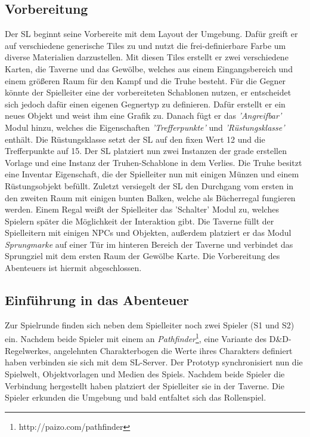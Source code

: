 \subsection{Vorbereitung}
\label{sec:Vorbereitung}
Der SL beginnt seine Vorbereite mit dem Layout der Umgebung. Dafür greift er auf verschiedene generische Tiles zu und nutzt die frei-definierbare Farbe um diverse Materialien darzustellen. Mit diesen Tiles erstellt er zwei verschiedene Karten, die Taverne und das Gewölbe, welches aus einem Eingangsbereich und einem größeren Raum für den Kampf und die Truhe besteht. Für die Gegner könnte der Spielleiter eine der vorbereiteten Schablonen nutzen, er entscheidet sich jedoch dafür einen eigenen Gegnertyp zu definieren. Dafür erstellt er ein neues Objekt und weist ihm eine Grafik zu. Danach fügt er das \emph{'Angreifbar'} Modul hinzu, welches die Eigenschaften \emph{'Trefferpunkte'} und \emph{'Rüstungsklasse'} enthält. Die Rüstungsklasse setzt der SL auf den fixen Wert 12 und die Trefferpunkte auf 15.\newline
Der SL platziert nun zwei Instanzen der grade erstellen Vorlage und eine Instanz der Truhen-Schablone in dem Verlies. Die Truhe besitzt eine Inventar Eigenschaft, die der Spielleiter nun mit einigen Münzen und einem Rüstungsobjekt befüllt. Zuletzt versiegelt der SL den Durchgang vom ersten in den zweiten Raum mit einigen bunten Balken, welche als Bücherregal fungieren werden. Einem Regal weißt der Spielleiter das 'Schalter' Modul zu, welches Spielern später die Möglichkeit der Interaktion gibt.\newline
Die Taverne füllt der Spielleitern mit einigen NPCs und Objekten, außerdem platziert er das Modul \emph{Sprungmarke} auf einer Tür im hinteren Bereich der Taverne und verbindet das Sprungziel mit dem ersten Raum der Gewölbe Karte.\newline
Die Vorbereitung des Abenteuers ist hiermit abgeschlossen.

\subsection{Einführung in das Abenteuer}
\label{sec:EinführungInDasAbenteuer}


Zur Spielrunde finden sich neben dem Spielleiter noch zwei Spieler (S1 und S2) ein. Nachdem beide Spieler mit einem an \emph{Pathfinder}\footnote{http://paizo.com/pathfinder}, eine Variante des D\&D-Regelwerkes, angelehnten Charakterbogen die Werte ihres Charakters definiert haben verbinden sie sich mit dem SL-Server. Der Prototyp synchronisiert nun die Spielwelt, Objektvorlagen und Medien des Spiels. Nachdem beide Spieler die Verbindung hergestellt haben platziert der Spielleiter sie in der Taverne.\newline
Die Spieler erkunden die Umgebung und bald entfaltet sich das Rollenspiel. 

